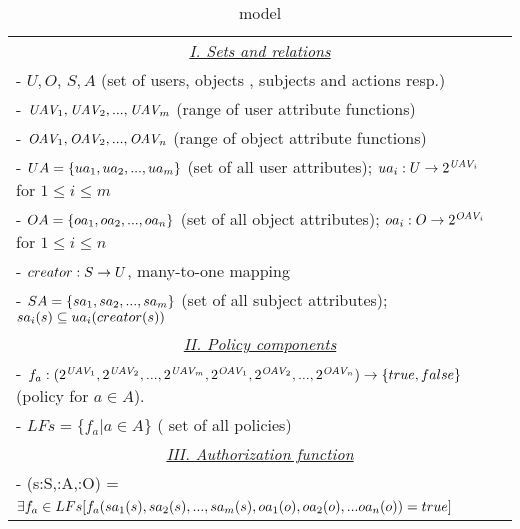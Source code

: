 \begin{table}[t]
	\centering
	\caption{ \LPMN{} model} %
	\label{tab:lp-abacmn-definition}
		\begin{tabular}{|l|}						
		\hline					
				\multicolumn{1}{|c|}{\underline{\textit{I. Sets and relations}}}\\			
				 - $U, O$, $S, A$ (set of users,  objects , subjects and actions resp.)\\
				 - $\textit{UAV}_{1}, \textit{UAV}_{2}, ..., \textit{UAV}_{m}$ (range of user attribute functions) \\
				 - $\textit{OAV}_{1}, \textit{OAV}_{2}, ..., \textit{OAV}_{n}$ (range of object attribute functions) \\
				 - $UA = \{ua_{1}, ua_{2}, ..., ua_{m}\}$ (set of all user attributes);   $ua_{i}: U \to 2^{\textit{UAV}_{i}}$ for $1 \le i \le m$\\
 				 -  $OA = \{oa_{1}, oa_{2}, ..., oa_{n}\}$ (set of all object attributes); $oa_{i}: O \to 2^{\textit{OAV}_{i}}$ for $1 \le i \le n$\\
  			     - $creator: S \to U$, many-to-one mapping \\
 				 - $SA = \{sa_{1}, sa_{2}, ..., sa_{m}\}$ (set of all subject attributes); $sa_{i}(s) \subseteq ua_{i}(creator(s))$\\	
				
				
				 \multicolumn{1}{|c|}{\underline{\textit{II. Policy components}}} \\						
				
				-  $f_a: (2^{\textit{UAV}_{1}}, 2^{\textit{UAV}_{2}}, ... ,2^{\textit{UAV}_{m}}, 2^{\textit{OAV}_{1}},  2^{\textit{OAV}_{2}}, ... , 2^{\textit{OAV}_{n}} )\to \{true, false\}$ (policy for $a \in A$).  \\
   			    - $LFs = \{f_a | a \in A \} $ ( set of all policies)\\			
				 
				
				 \multicolumn{1}{|c|}{\underline{\textit{III. Authorization function}}} \\						
				- \request(s:S,\amem:A,\objmem:O) = \\	\hfill  $\exists f_a \in LFs[f_a(sa_{1}(s), sa_{2}(s),..., sa_{m}(s),  oa_{1}(o), oa_{2}(o), ... oa_{n}(o)) = true] $  
			
\\ \hline	
	\end{tabular}
	
\end{table}


